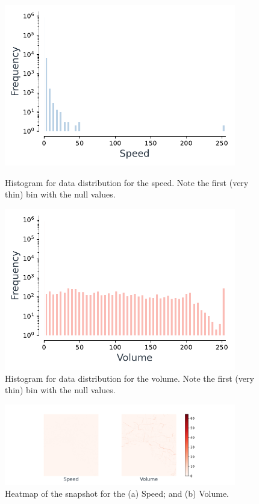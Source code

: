 \begin{figure}[!ht]
    \centering
    \begin{minipage}{0.45\textwidth}
        \centering
        \includegraphics[width=0.9\textwidth]{./figures/speed.pdf}
         \caption{Histogram for data distribution for the speed. Note the first (very thin) bin with the null values.}
         \label{fig:speed}
    \end{minipage}\hfill
    \begin{minipage}{0.45\textwidth}
        \centering
        \includegraphics[width=0.9\textwidth]{./figures/volume.pdf}
         \caption{Histogram for data distribution for the volume. Note the first (very thin) bin with the null values.}
         \label{fig:volume}
    \end{minipage}
\end{figure}


\begin{figure}[!ht]
\noindent\hspace{0.5mm}\includegraphics[width=0.9\textwidth]{./figures/heatmaps_speed_volume.pdf}
\caption{Heatmap of the snapshot for the (a) Speed; and (b) Volume.}
\label{fig:heatmap}
\end{figure}


